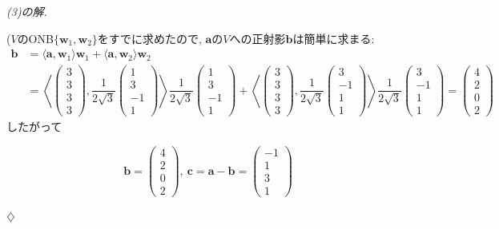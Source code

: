 \documentclass[titlepage]{jsarticle}
\numberwithin{equation}{section}
\newenvironment{kaitou}[1][解]{%
\begin{proofbox}%
\textit{#1. }\ignorespaces
}{%
\hfill$\diamondsuit$%
\end{proofbox}%
}
\begin{document}
\begin{kaitou}[(3)の解]
($V$のONB$\{\bm{w}_1, \bm{w}_2\}$をすでに求めたので, $\bm{a}$の$V$への正射影$\bm{b}$は簡単に求まる:
\begin{align*}
\bm{b} &= \langle \bm{a}, \bm{w}_1 \rangle\bm{w}_1 + \langle \bm{a}, \bm{w}_2 \rangle\bm{w}_2\\
	& = \left\langle
\begin{pmatrix}
3\\
3\\
3\\
3
\end{pmatrix}
,\dfrac{1}{2\sqrt{3}}
\begin{pmatrix}
1\\
3\\
-1\\
1
\end{pmatrix}
\right\rangle \dfrac{1}{2\sqrt{3}}
\begin{pmatrix}
1\\
3\\
-1\\
1
\end{pmatrix}
+
\left\langle
\begin{pmatrix}
3\\
3\\
3\\
3
\end{pmatrix}
,\dfrac{1}{2\sqrt{3}}
\begin{pmatrix}
3\\
-1\\
1\\
1
\end{pmatrix}
\right\rangle
\dfrac{1}{2\sqrt{3}}
\begin{pmatrix}
3\\
-1\\
1\\
1
\end{pmatrix}
= 
\begin{pmatrix}
4\\
2\\
0\\
2
\end{pmatrix}
\end{align*}
したがって
\begin{answerbox}
\[
\bm{b}=
\begin{pmatrix}
4\\
2\\
0\\
2
\end{pmatrix}
,\:
\bm{c}=
\bm{a}-\bm{b}=
\begin{pmatrix}
-1\\
1\\
3\\
1
\end{pmatrix}
\]
\end{answerbox}
\end{kaitou}
\end{document}
